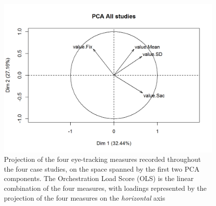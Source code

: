 \documentclass[10pt,journal,compsoc]{IEEEtran}
\begin{document}

\begin{figure}[!t]
\centering
\includegraphics[width=\linewidth]{PCA.png}
\caption{Projection of the four eye-tracking measures recorded throughout the four case studies, on the space spanned by the first two PCA components. The Orchestration Load Score (OLS) is the linear combination of the four measures, with loadings represented by the projection of the four measures on the \textit{horizontal} axis}
\label{fig:pca}
\end{figure}
\end{document}

